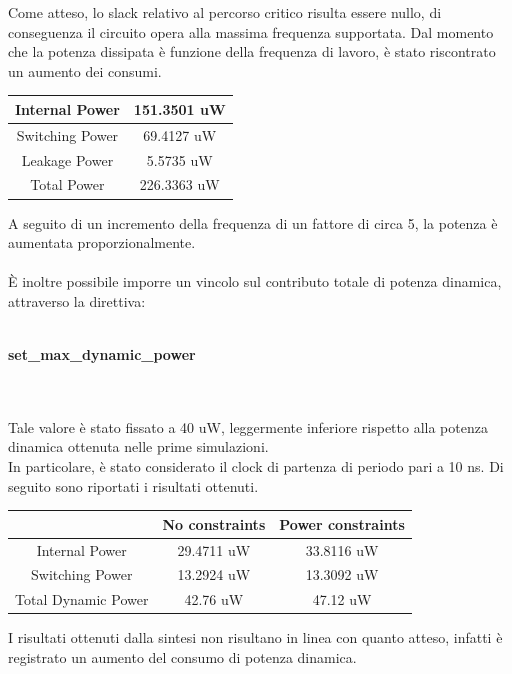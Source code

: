 \documentclass[11pt,  english, makeidx, a4paper, titlepage, oneside]{book}
\begin{document}
\vspace{0.3cm} 
Come atteso, lo slack relativo al percorso critico risulta essere nullo, di conseguenza il circuito opera alla massima frequenza supportata.
Dal momento che la potenza dissipata è funzione della frequenza di lavoro, è stato riscontrato un aumento dei consumi.
\\
\begin{center}
	\begin{tabular}{|c|c|}
	\hline
	Internal Power & 151.3501 uW \\
	\hline
	Switching Power & 69.4127 uW \\
	\hline
	Leakage Power & 5.5735 uW \\
	\hline
	Total Power & 226.3363 uW \\
	\hline
	\end{tabular}	
\end{center}
\vspace{0.3cm} 
A seguito di un incremento della frequenza di un fattore di circa 5, la potenza è aumentata proporzionalmente.
\\\\
È inoltre possibile imporre un vincolo sul contributo totale di potenza dinamica, attraverso la direttiva:
\\\\
\centerline{\textbf{set\_max\_dynamic\_power}}
\\\\
Tale valore è stato fissato a 40 uW, leggermente inferiore rispetto alla potenza dinamica ottenuta nelle prime simulazioni.
\\
In particolare, è stato considerato il clock di partenza di periodo pari a 10 ns.
Di seguito sono riportati i risultati ottenuti.
\\
\begin{center}
	\begin{tabular}{|c|c|c|}
	\hline
	& No constraints & Power constraints\\
	\hline
	Internal Power & 29.4711 uW & 33.8116 uW \\
	\hline
	Switching Power & 13.2924 uW & 13.3092 uW \\
	\hline
	Total Dynamic Power & 42.76 uW & 47.12 uW \\
	\hline
	\end{tabular}	
\end{center}
\vspace{0.3cm}  
I risultati ottenuti dalla sintesi non risultano in linea con quanto atteso, infatti è registrato un aumento del consumo di potenza dinamica.
\end{document}
